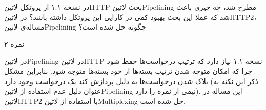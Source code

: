 \documentclass[../main.tex]{subfiles}
\begin{document}

در نسخه ۱.۱ از پروتکل ‌لاتین{HTTP} بحث ‌لاتین{Pipelining} مطرح شد، چه چیزی باعث شد که عملا این بحث بهبود کمی در کارایی این پروتکل داشته باشد؟
در ‌لاتین{HTTP2}، مساله‌ی ‌لاتین{Pipelining} چگونه حل شده است؟

۲ نمره

\begin{answer}

در ‌لاتین{Pipelining} در ‌لاتین{HTTP} نسخه ۱.۱ نیاز دارد که ترتیب درخواست‌ها حفظ شود
چرا که امکان متوجه شدن ترتیب بسته‌ها از خود بسته‌ها متوجه شود.
بنابراین مشکل بلاک شدن درخواست‌ها به دلیل پردازش کند یک درخواست
وجود دارد (ذکر این نکته به عنوان دلیل عدم استفاده از ‌لاتین{Pipelining} نیمی از نمره را دارد). این مساله در ‌لاتین{HTTP2} با استفاده از ‌لاتین{Multiplexing} حل شده است.

\end{answer}
\end{document}
